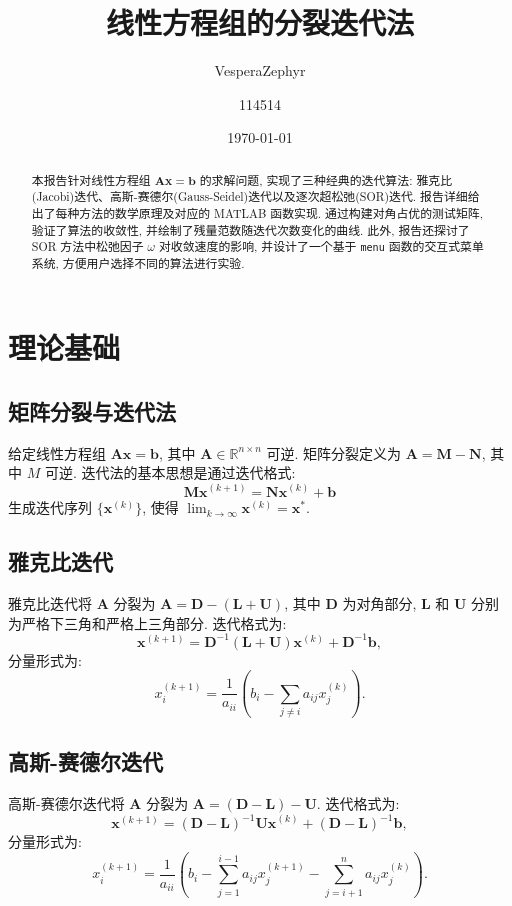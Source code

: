 \documentclass[11pt, a4paper]{article}
\title{\textbf{线性方程组的分裂迭代法}}
\author{VesperaZephyr\and 114514}
\date{\today}
\begin{document}
    \maketitle
\begin{abstract}
本报告针对线性方程组 $\bm{Ax}=\bm{b}$ 的求解问题, 实现了三种经典的迭代算法: 雅克比(Jacobi)迭代、高斯-赛德尔(Gauss-Seidel)迭代以及逐次超松弛(SOR)迭代. 报告详细给出了每种方法的数学原理及对应的 MATLAB 函数实现. 通过构建对角占优的测试矩阵, 验证了算法的收敛性, 并绘制了残量范数随迭代次数变化的曲线. 此外, 报告还探讨了 SOR 方法中松弛因子 $\omega$ 对收敛速度的影响, 并设计了一个基于 \texttt{menu} 函数的交互式菜单系统, 方便用户选择不同的算法进行实验. 
\end{abstract}
\tableofcontents
\section{理论基础}

\subsection{矩阵分裂与迭代法}

给定线性方程组 $\bm{Ax} = \bm{b}$, 其中 $\bm{A} \in \mathbb{R}^{n \times n}$ 可逆. 矩阵分裂定义为 $\bm{A} = \bm{M} - \bm{N}$, 其中 $M$ 可逆. 迭代法的基本思想是通过迭代格式: 
\[
\bm{Mx}^{(k+1)} = \bm{Nx}^{(k)} + \bm{b}
\]
生成迭代序列 $\{\bm{x}^{(k)}\}$, 使得 $\lim_{k \to \infty} \bm{x}^{(k)} = \bm{x}^*$. 

\subsection{雅克比迭代}

雅克比迭代将 $\bm{A}$ 分裂为 $\bm{A} = \bm{D} - (\bm{L} + \bm{U})$, 其中 $\bm{D}$ 为对角部分, $\bm{L}$ 和 $\bm{U}$ 分别为严格下三角和严格上三角部分. 迭代格式为: 
\[
\bm{x}^{(k+1)} = \bm{D}^{-1}(\bm{L} + \bm{U})\bm{x}^{(k)} + \bm{D}^{-1}\bm{b},
\]
分量形式为: 
\[
x_i^{(k+1)} = \frac{1}{a_{ii}} \left( b_i - \sum_{j \neq i} a_{ij} x_j^{(k)} \right).
\]

\subsection{高斯-赛德尔迭代}

高斯-赛德尔迭代将 $\bm{A}$ 分裂为 $\bm{A} = (\bm{D} - \bm{L}) - \bm{U}$. 迭代格式为: 
\[
\bm{x}^{(k+1)} = (\bm{D} - \bm{L})^{-1}\bm{Ux}^{(k)} + (\bm{D} - \bm{L})^{-1}\bm{b},
\]
分量形式为: 
\[
x_i^{(k+1)} = \frac{1}{a_{ii}} \left( b_i - \sum_{j=1}^{i-1} a_{ij} x_j^{(k+1)} - \sum_{j=i+1}^{n} a_{ij} x_j^{(k)} \right).
\]
\end{document}
